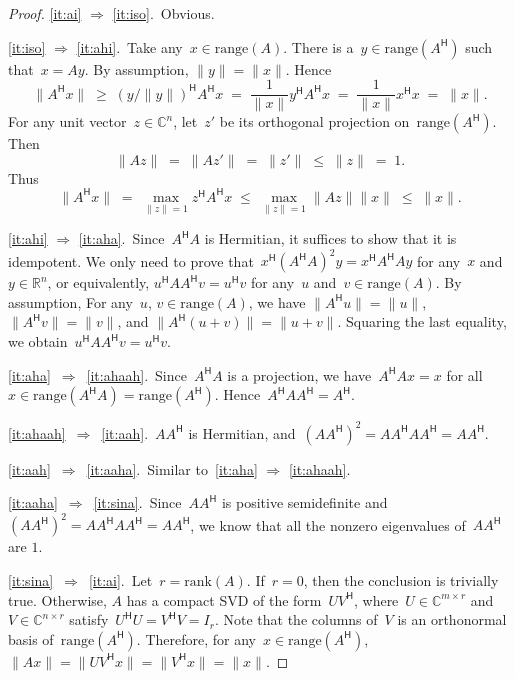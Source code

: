\documentclass[11pt,a4paper]{article}  %
\numberwithin{equation}{section}
\theoremstyle{definition}
\def\RR{\mathbb{R}}
\def\CC{\mathbb{C}}
\newcommand{\hmt}{{\scriptscriptstyle{{\mathsf{H}}}}}
\newcommand{\rank}{\mathrm{rank}}
\newcommand{\range}{\mathrm{range}}
\begin{document}
\begin{proof}
  \ref{it:ai} $\Rightarrow $ \ref{it:iso}.~Obvious.

  \ref{it:iso} $\Rightarrow $ \ref{it:ahi}.~Take any~$x\in \range(A)$.
  There is a~$y \in \range(A^\hmt)$ such that~$x=Ay$. By assumption, $\|y\|=\|x\|$. Hence
    \begin{equation*}
      \|A^\hmt x\| \;\ge\; (y/\|y\|)^\hmt A^\hmt x \;=\; \frac{1}{\|x\|} y^\hmt A^\hmt x \;=\;
      \frac{1}{\|x\|} x^\hmt x\;=\; \|x\|.
    \end{equation*}
  For any unit vector~$z\in\CC^{n}$, let~$z'$ be its orthogonal projection on~$\range(A^\hmt)$.
  Then
  \begin{equation*}
  \|Az\|\;=\;\|Az'\|\;=\;\|z'\|\;\le\;\|z\|\;=\;1.
  \end{equation*}
  Thus
    \begin{equation*}
      \|A^\hmt x\| \;=\; \max_{\|z\|=1}z^\hmt A^\hmt x
      \;\le\; \max_{\|z\|=1}\|Az\|\|x\| \;\le\; \|x\|.
    \end{equation*}

    \ref{it:ahi} $\Rightarrow $ \ref{it:aha}.~Since~$A^\hmt A$ is Hermitian, it suffices to show that it is idempotent. We
      only need to prove that~$x^\hmt(A^\hmt A)^2y=x^\hmt A^\hmt Ay$ for any~$x$ and~$y\in \RR^n$,
      or equivalently, $u^\hmt A A^\hmt v=u^\hmt v$ for  any~$u$ and~$v\in \range(A)$. By
      assumption,
      For any~$u$, $v\in\range(A)$, we have $\|A^\hmt u\|=\|u\|$, $\|A^\hmt v\|=\|v\|$, and
      $\|A^\hmt (u+v)\| = \|u+v\|$. Squaring the last equality, we obtain~$u^\hmt AA^\hmt v = u^\hmt
      v$.

      \ref{it:aha}~$\Rightarrow$~\ref{it:ahaah}.~Since~$A^\hmt A$ is a projection, we have~$A^\hmt A x = x$ for all~$x\in \range(A^\hmt A)
    = \range(A^\hmt)$. Hence~$A^\hmt AA^\hmt = A^\hmt$.

    \ref{it:ahaah}~$\Rightarrow$~\ref{it:aah}.~$AA^\hmt$ is Hermitian, and~$(AA^\hmt)^2=AA^\hmt AA^\hmt = AA^\hmt$.

    \ref{it:aah}~$\Rightarrow$~\ref{it:aaha}.~Similar to~\ref{it:aha} $\Rightarrow$ \ref{it:ahaah}.

    \ref{it:aaha}~$\Rightarrow$~\ref{it:sina}.~Since~$AA^\hmt$ is positive semidefinite
    and~$(AA^\hmt)^2=AA^\hmt AA^\hmt =AA^\hmt$, we know that all the nonzero eigenvalues of~$AA^\hmt$ are $1$.

    \ref{it:sina}~$\Rightarrow$~\ref{it:ai}.~Let~$r=\rank(A)$. If~$r = 0$, then the conclusion is trivially true.
       Otherwise, $A$ has a compact SVD of the form~$UV^\hmt$,
       where~$U\in\CC^{m\times r}$ and~$V\in\CC^{n\times r}$ satisfy~$U^\hmt U = V^\hmt V = I_r$.
       Note that the columns of~$V$ is an orthonormal basis of~$\range(A^\hmt)$.
       Therefore, for any~$x\in \range(A^\hmt)$,
         $\|A x\|= \|UV^\hmt x\| = \|V^\hmt x\| = \|x\|$.
\end{proof}
\end{document}
